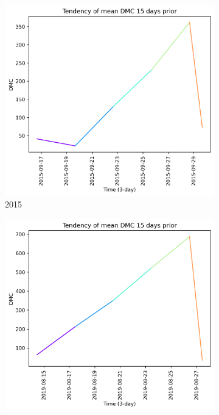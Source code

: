 \begin{figure}[h]
    \centering
    \caption{DMC values 15 days prior to wildfire}
    \begin{subfigure}{0.3\textwidth}
        \centering
        \includegraphics[width=\textwidth]{graphs/15days/2015_15daysprior_tendency_graph_DMC.png}
        \caption{2015}
        \label{fig:dmc_prior_15_days_2015}
    \end{subfigure}
    \hfill
    \begin{subfigure}{0.3\textwidth}
        \centering
        \includegraphics[width=\textwidth]{graphs/15days/2019_15daysprior_tendency_graph_DMC.png}

\end{subfigure}
\end{figure}
